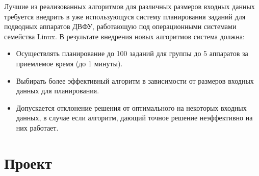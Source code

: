 \documentclass[a4paper,14pt,russian]{article}
\begin{document}
Лучшие из реализованных алгоритмов для различных размеров входных данных требуется внедрить в уже использующуся систему планирования заданий для подводных аппаратов ДВФУ, работающую под операционными системами семейства Linux. В результате внедрения новых алгоритмов система должна:
\begin{itemize}

\item Осуществлять планирование до 100 заданий для группы до 5 аппаратов за приемлемое время (до 1 минуты).
\item Выбирать более эффективный алгоритм в зависимости от размеров входных данных для планирования.
\item Допускается отклонение решения от оптимального на некоторых входных данных, в случае если алгоритм, дающий точное решение неэффективно на них работает.
\end{itemize}

\section{Проект}
\end{document}
